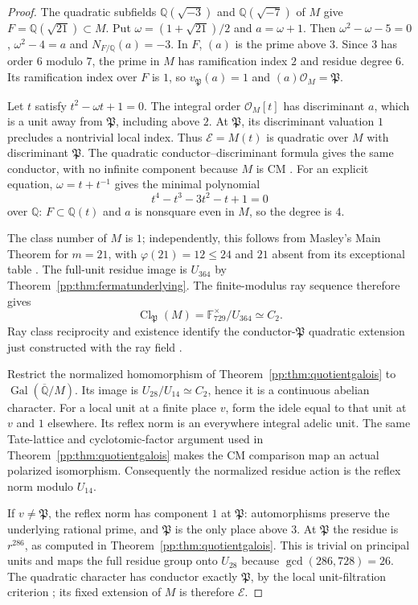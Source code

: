 \begin{proof}
The quadratic subfields $\mathbb Q(\sqrt{-3})$ and
$\mathbb Q(\sqrt{-7})$ of $M$ give $F=\mathbb Q(\sqrt{21})\subset M$.
Put $\omega=(1+\sqrt{21})/2$ and $a=\omega+1$. Then
$\omega^2-\omega-5=0$, $\omega^2-4=a$ and $N_{F/\mathbb Q}(a)=-3$.
In $F$, $(a)$ is the prime above $3$. Since $3$ has order $6$
modulo $7$, the prime in $M$ has ramification index $2$ and residue
degree $6$. Its ramification index over $F$ is $1$, so
$v_{\mathfrak P}(a)=1$ and $(a)\mathcal O_M=\mathfrak P$.

Let $t$ satisfy $t^2-\omega t+1=0$. The integral order
$\mathcal O_M[t]$ has discriminant $a$, which is a unit away from
$\mathfrak P$, including above $2$. At $\mathfrak P$, its discriminant
valuation $1$ precludes a nontrivial local index. Thus
$\mathcal E=M(t)$ is quadratic over $M$ with discriminant
$\mathfrak P$. The quadratic conductor--discriminant formula gives
the same conductor, with no infinite component because $M$ is CM
\cite[Theorem V.3.27]{MilneCFT2020}.
For an explicit equation, $\omega=t+t^{-1}$ gives the minimal polynomial
\[
 t^4-t^3-3t^2-t+1=0
\]
over $\mathbb Q$: $F\subset\mathbb Q(t)$ and $a$ is nonsquare even
in $M$, so the degree is $4$.

The class number of $M$ is $1$; independently, this follows from
Masley's Main Theorem for $m=21$, with $\varphi(21)=12\le24$ and
$21$ absent from its exceptional table \cite[p.~179]{Masley1976}.
The full-unit residue image is $U_{364}$ by
Theorem~\ref{pp:thm:fermatunderlying}. The finite-modulus ray sequence
therefore gives
\[
 \operatorname{Cl}_{\mathfrak P}(M)
 =\mathbb F_{729}^{\times}/U_{364}\simeq C_2.
\]
Ray class reciprocity and existence identify the conductor-$\mathfrak P$
quadratic extension just constructed with the ray field
\cite[Theorems V.1.7, V.3.6 and Remark V.3.8]{MilneCFT2020}.

Restrict the normalized homomorphism of
Theorem~\ref{pp:thm:quotientgalois} to
$\operatorname{Gal}(\overline{\mathbb Q}/M)$. Its image is
$U_{28}/U_{14}\simeq C_2$, hence it is a continuous abelian character.
For a local unit at a finite place $v$, form the idele equal to that
unit at $v$ and $1$ elsewhere. Its reflex norm is an everywhere
integral adelic unit. The same Tate-lattice and cyclotomic-factor
argument used in Theorem~\ref{pp:thm:quotientgalois} makes the CM
comparison map an actual polarized isomorphism. Consequently the
normalized residue action is the reflex norm modulo $U_{14}$.

If $v\ne\mathfrak P$, the reflex norm has component $1$ at
$\mathfrak P$: automorphisms preserve the underlying rational prime,
and $\mathfrak P$ is the only place above $3$. At $\mathfrak P$
the residue is $r^{286}$, as computed in
Theorem~\ref{pp:thm:quotientgalois}. This is trivial on principal units
and maps the full residue group onto $U_{28}$ because
$\gcd(286,728)=26$. The quadratic character has conductor exactly
$\mathfrak P$, by the local unit-filtration criterion
\cite[Section I.1.9]{MilneCFT2020}; its fixed extension of $M$ is
therefore $\mathcal E$.


\end{proof}
